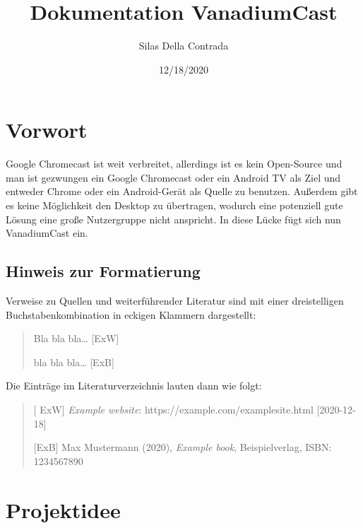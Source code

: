 \documentclass{article}
\title{Dokumentation VanadiumCast}
\author{Silas Della Contrada}
\date{12/18/2020}
\begin{document}
    \begin{titlingpage}
        \maketitle
    \end{titlingpage}

    \tableofcontents

    \newpage


    \section{Vorwort}\label{sec:vorwort}

    Google Chromecast ist weit verbreitet, allerdings ist es kein
    Open-Source und man ist gezwungen ein Google Chromecast oder ein Android
    TV als Ziel und entweder Chrome oder ein Android-Gerät als Quelle zu
    benutzen. Außerdem gibt es keine Möglichkeit den Desktop zu übertragen,
    wodurch eine potenziell gute Lösung eine große Nutzergruppe nicht
    anspricht. In diese Lücke fügt sich nun VanadiumCast ein.

    \subsection{Hinweis zur Formatierung}\label{sec:hinweis-zur-formatierung}

    Verweise zu Quellen und weiterführender Literatur sind mit einer
    dreistelligen Buchstabenkombination in eckigen Klammern dargestellt:

    \begin{quote}
        Bla bla bla\ldots{} {[}ExW{]}

        bla bla bla\ldots{} {[}ExB{]}
    \end{quote}
    Die Einträge im Literaturverzeichnis lauten dann wie folgt:

    \begin{quote}
    {[}
        ExW{]} \emph{Example website}: https://example.com/examplesite.html
        {[}2020-12-18{]}

        {[}ExB{]} Max Mustermann (2020), \emph{Example book}, Beispielverlag,
        ISBN: 1234567890
    \end{quote}

    \newpage


    \section{Projektidee}\label{sec:projektidee}
\end{document}
